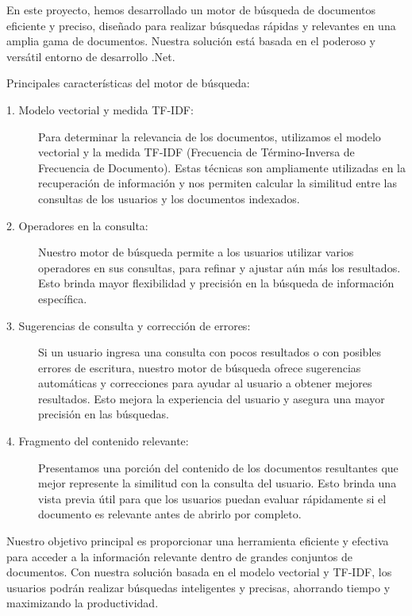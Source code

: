 \documentclass[10pt]{article}
\begin{document}
En este proyecto, hemos desarrollado un motor de búsqueda de documentos eficiente y preciso, diseñado para realizar búsquedas rápidas y relevantes en una amplia gama de documentos. Nuestra solución está basada en el poderoso y versátil entorno de desarrollo .Net.

\vspace{.5cm}

Principales características del motor de búsqueda:

\vspace{.5cm}

\begin{description}
	\item[1. Modelo vectorial y medida TF-IDF:] Para determinar la relevancia de los documentos, utilizamos el modelo vectorial y la medida TF-IDF (Frecuencia de Término-Inversa de Frecuencia de Documento). Estas técnicas son ampliamente utilizadas en la recuperación de información y nos permiten calcular la similitud entre las consultas de los usuarios y los documentos indexados.
	\item[2. Operadores en la consulta:] Nuestro motor de búsqueda permite a los usuarios utilizar varios operadores en sus consultas, para refinar y ajustar aún más los resultados. Esto brinda mayor flexibilidad y precisión en la búsqueda de información específica.
	\item[3. Sugerencias de consulta y corrección de errores:] Si un usuario ingresa una consulta con pocos resultados o con posibles errores de escritura, nuestro motor de búsqueda ofrece sugerencias automáticas y correcciones para ayudar al usuario a obtener mejores resultados. Esto mejora la experiencia del usuario y asegura una mayor precisión en las búsquedas.
	\item[4. Fragmento del contenido relevante:] Presentamos una porción del contenido de los documentos resultantes que mejor represente la similitud con la consulta del usuario. Esto brinda una vista previa útil para que los usuarios puedan evaluar rápidamente si el documento es relevante antes de abrirlo por completo.
	
\end{description}

Nuestro objetivo principal es proporcionar una herramienta eficiente y efectiva para acceder a la información relevante dentro de grandes conjuntos de documentos. Con nuestra solución basada en el modelo vectorial y TF-IDF, los usuarios podrán realizar búsquedas inteligentes y precisas, ahorrando tiempo y maximizando la productividad.
\end{document}
